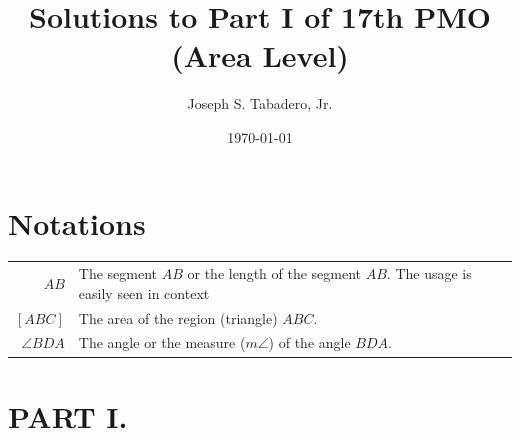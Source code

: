 \documentclass{article}
\title{Solutions to Part I of 17th PMO (Area Level)}
\author{Joseph S. Tabadero, Jr.}
\date{\today}
\begin{document}
\maketitle
	
\section*{Notations}

\begin{tabular}{rl}
	$AB$ & The segment $AB$ or the length of the segment $AB$. The usage is easily seen in context\\
	$[ABC]$ & The area of the region (triangle) $ABC$.\\
	$\angle BDA$ & The angle or the measure ($m\angle$) of the angle $BDA$.
\end{tabular}



\section{PART I.}
\end{document}
